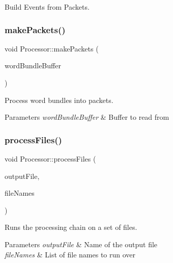 Build Events from Packets. 

\mbox{\label{class_processor_a554de487c5e8205872151fbedb315291}} 
\subsubsection{\texorpdfstring{make\+Packets()}{makePackets()}}
{\footnotesize\ttfamily void Processor\+::make\+Packets (\begin{DoxyParamCaption}\item[{std\+::shared\+\_\+ptr$<$ \hyperlink{class_processor_a531b4c5f7c0d810fc6e9e1dd3d115725}{bundle\+Buffer} $>$}]{word\+Bundle\+Buffer }\end{DoxyParamCaption})\hspace{0.3cm}{\ttfamily [private]}}



Process word bundles into packets. 


\begin{DoxyParams}{Parameters}
{\em word\+Bundle\+Buffer} & Buffer to read from \\
\hline
\end{DoxyParams}
\mbox{\label{class_processor_a18f7d93604ac0b8c53aea579330538dc}} 
\subsubsection{\texorpdfstring{process\+Files()}{processFiles()}}
{\footnotesize\ttfamily void Processor\+::process\+Files (\begin{DoxyParamCaption}\item[{const std\+::string}]{output\+File,  }\item[{const std\+::vector$<$ std\+::string $>$ \&}]{file\+Names }\end{DoxyParamCaption})}



Runs the processing chain on a set of files. 


\begin{DoxyParams}{Parameters}
{\em output\+File} & Name of the output file \\
\hline
{\em file\+Names} & List of file names to run over \\
\hline
\end{DoxyParams}
\mbox{\label{class_processor_a3710adfb2311c70d9402e25a8615ace4}} 
